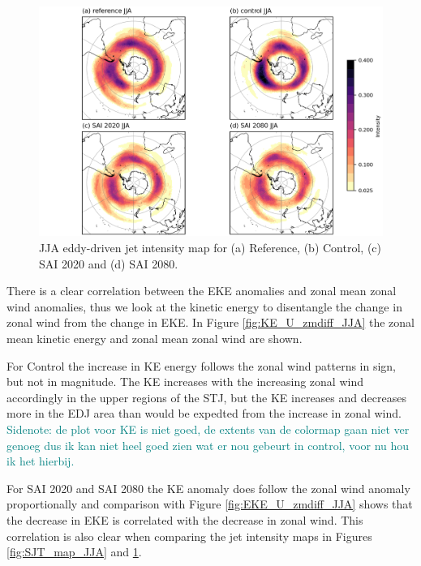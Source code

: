 \begin{figure}[H]
	\centering
	\includegraphics[width=0.95\linewidth]{images/EDJ_map_JJA.png}
	\caption{JJA eddy-driven jet intensity map for (a) Reference, (b) Control, (c) SAI 2020 and (d) SAI 2080.}
	\label{fig:EDJ_map_JJA}
\end{figure}

There is a clear correlation between the EKE anomalies and zonal mean zonal wind anomalies, thus we look at the kinetic energy to disentangle the change in zonal wind from the change in EKE. In Figure \ref{fig:KE_U_zmdiff_JJA} the zonal mean kinetic energy and zonal mean zonal wind are shown. 

For Control the increase in KE energy follows the zonal wind patterns in sign, but not in magnitude. The KE increases with the increasing zonal wind accordingly in the upper regions of the STJ, but the KE increases and decreases more in the EDJ area than would be expedted from the increase in zonal wind. \textcolor{teal}{Sidenote: de plot voor KE is niet goed, de extents van de colormap gaan niet ver genoeg dus ik kan niet heel goed zien wat er nou gebeurt in control, voor nu hou ik het hierbij.}

For SAI 2020 and SAI 2080 the KE anomaly does follow the zonal wind anomaly proportionally and comparison with Figure \ref{fig:EKE_U_zmdiff_JJA} shows that the decrease in EKE is correlated with the decrease in zonal wind. This correlation is also clear when comparing the jet intensity maps in Figures \ref{fig:SJT_map_JJA} and \ref{fig:EDJ_map_JJA}.

